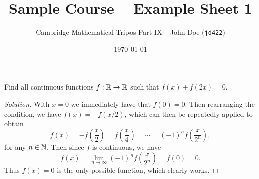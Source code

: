 \documentclass[a4paper]{scrartcl}
\title{Sample Course -- Example Sheet 1}
\author{Cambridge Mathematical Tripos Part IX -- John Doe (\texttt{jd422})}
\date{\today}
\begin{document}
\maketitle

\begin{problem}
  Find all continuous functions $f: \mathbb{R} \rightarrow \mathbb{R}$ such that $f(x) + f(2x) = 0$.
\end{problem}
\begin{proof}[Solution]
  With $x = 0$ we immediately have that $f(0) = 0$. Then rearranging the condition, we have $
f(x) = - f(x/2)$,
which can then be repeatedly applied to obtain
  $$
  f(x) = - f\left(\frac{x}{2}\right) = f\left(\frac{x}{4}\right) = \cdots = (-1)^n f\left(\frac{x}{2^n}\right),
  $$
  for any $n \in \mathbb{N}$.
  Then since $f$ is continuous, we have
  $$
f(x) = \lim_{n \to \infty} (-1)^n f \left(\frac{x}{2^n}\right) = f(0) = 0.
  $$
  Thus $f(x) = 0$ is the only possible function, which clearly works.
\end{proof}

\end{document}
